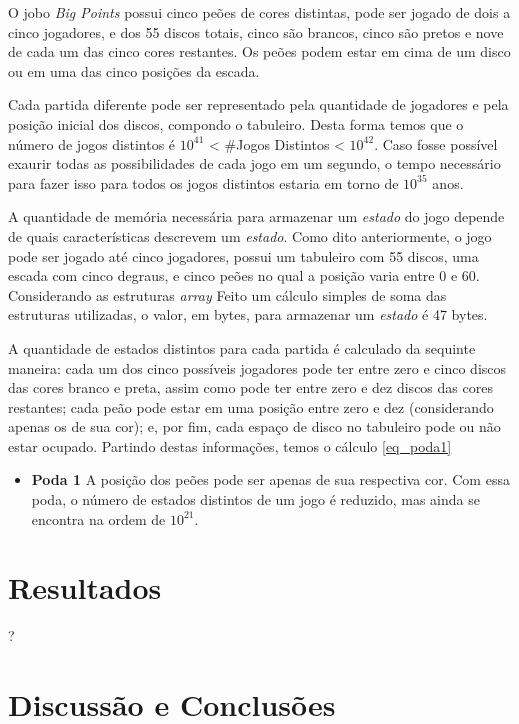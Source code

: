 \documentclass[dvipdfm, a4paper, 11pt]{article}
\begin{document}
O jobo \emph{Big Points} possui cinco peões de cores distintas, pode ser
jogado de dois a cinco jogadores, e dos 55 discos totais, cinco são
brancos, cinco são pretos e nove de cada um das cinco cores restantes.
Os peões podem estar em cima de um disco ou em uma das cinco posições da
escada.

Cada partida diferente pode ser representado pela quantidade de
jogadores e pela posição inicial dos discos, compondo o tabuleiro. Desta
forma temos que o número de jogos distintos é $10^{41}$ \textless{}
\#Jogos Distintos \textless{} $10^{42}$. Caso fosse possível exaurir
todas as possibilidades de cada jogo em um segundo, o tempo necessário
para fazer isso para todos os jogos distintos estaria em torno de
$10^{35}$ anos.

A quantidade de memória necessária para armazenar um \emph{estado} do
jogo depende de quais características descrevem um \emph{estado}. Como
dito anteriormente, o jogo pode ser jogado até cinco jogadores, possui
um tabuleiro com 55 discos, uma escada com cinco degraus, e cinco peões
no qual a posição varia entre 0 e 60. Considerando as estruturas
\emph{array} Feito um cálculo simples de soma das estruturas utilizadas,
o valor, em bytes, para armazenar um \emph{estado} é 47 bytes.

A quantidade de estados distintos para cada partida é calculado da
sequinte maneira: cada um dos cinco possíveis jogadores pode ter entre
zero e cinco discos das cores branco e preta, assim como pode ter entre
zero e dez discos das cores restantes; cada peão pode estar em uma
posição entre zero e dez (considerando apenas os de sua cor); e, por
fim, cada espaço de disco no tabuleiro pode ou não estar ocupado.
Partindo destas informações, temos o cálculo \ref{eq_poda1}

\begin{itemize}
\itemsep1pt\parskip0pt
\item
  \textbf{Poda 1} A posição dos peões pode ser apenas de sua respectiva
  cor. Com essa poda, o número de estados distintos de um jogo é
  reduzido, mas ainda se encontra na ordem de $10^{21}$.
\end{itemize}

\section{Resultados}\label{resultados}

?

\section{Discussão e Conclusões}\label{discussuxe3o-e-conclusuxf5es}
\end{document}
